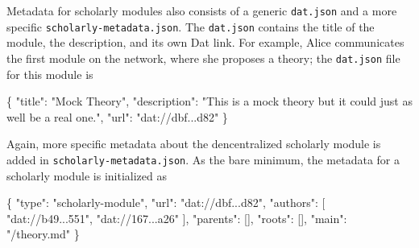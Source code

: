 \documentclass[a4paper]{article}
\newenvironment{Shaded}{\begin{snugshade}}{\end{snugshade}}
\newcommand{\DataTypeTok}[1]{\textcolor[rgb]{0.13,0.29,0.53}{#1}}
\newcommand{\FunctionTok}[1]{\textcolor[rgb]{0.00,0.00,0.00}{#1}}
\newcommand{\OtherTok}[1]{\textcolor[rgb]{0.56,0.35,0.01}{#1}}
\newcommand{\StringTok}[1]{\textcolor[rgb]{0.31,0.60,0.02}{#1}}
\begin{document}
Metadata for scholarly modules also consists of a generic
\texttt{dat.json} and a more specific \texttt{scholarly-metadata.json}.
The \texttt{dat.json} contains the title of the module, the description,
and its own Dat link. For example, Alice communicates the first module
on the network, where she proposes a theory; the \texttt{dat.json} file
for this module is

\begin{Shaded}
\begin{Highlighting}[]
\FunctionTok{\{}
  \DataTypeTok{"title"}\FunctionTok{:} \StringTok{"Mock Theory"}\FunctionTok{,}
  \DataTypeTok{"description"}\FunctionTok{:} \StringTok{"This is a mock theory but it could just as well be a real one."}\FunctionTok{,}
  \DataTypeTok{"url"}\FunctionTok{:} \StringTok{"dat://dbf...d82"}
\FunctionTok{\}}
\end{Highlighting}
\end{Shaded}

Again, more specific metadata about the dencentralized scholarly module
is added in \texttt{scholarly-metadata.json}. As the bare minimum, the
metadata for a scholarly module is initialized as

\begin{Shaded}
\begin{Highlighting}[]
\FunctionTok{\{}
  \DataTypeTok{"type"}\FunctionTok{:} \StringTok{"scholarly-module"}\FunctionTok{,}
  \DataTypeTok{"url"}\FunctionTok{:} \StringTok{"dat://dbf...d82"}\FunctionTok{,}
  \DataTypeTok{"authors"}\FunctionTok{:} \OtherTok{[}
    \StringTok{"dat://b49...551"}\OtherTok{,}
    \StringTok{"dat://167...a26"}
  \OtherTok{]}\FunctionTok{,}
  \DataTypeTok{"parents"}\FunctionTok{:} \OtherTok{[]}\FunctionTok{,}
  \DataTypeTok{"roots"}\FunctionTok{:} \OtherTok{[]}\FunctionTok{,}
  \DataTypeTok{"main"}\FunctionTok{:} \StringTok{"/theory.md"}
\FunctionTok{\}}
\end{Highlighting}
\end{Shaded}
\end{document}
